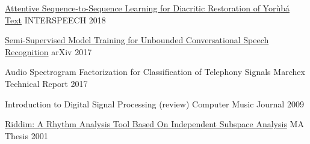 
\begin{cvhonors}

  \cvhonor
    {\href{https://arxiv.org/abs/1804.00832}{Attentive Sequence-to-Sequence Learning for Diacritic Restoration of Yor{\`u}b{\'a} Text}} %
    {INTERSPEECH} %
    {} %
    {2018} %

  \cvhonor
    {\href{https://arxiv.org/abs/1705.09724}{Semi-Supervised Model Training for Unbounded Conversational Speech Recognition}} %
    {arXiv} %
    {} %
    {2017} %

  \cvhonor
    {Audio Spectrogram Factorization for Classification of Telephony Signals} %
    {Marchex Technical Report} %
    {} %
    {2017} %

  \cvhonor
    {Introduction to Digital Signal Processing (review)} %
    {Computer Music Journal} %
    {} %
    {2009} %
        
  \cvhonor
    {\href{https://arxiv.org/abs/1705.04792}{Riddim: A Rhythm Analysis Tool Based On Independent Subspace Analysis}} %
    {MA Thesis} %
    {} %
    {2001} %
    
\end{cvhonors}
